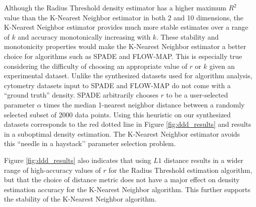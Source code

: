 \documentclass{article}
\begin{document}
Although the Radius Threshold density estimator has a higher maximum $R^2$ value than the K-Nearest Neighbor estimator in both 2 and 10 dimensions, the K-Nearest Neighbor estimator provides much more stable estimates over a range of $k$ and accuracy monotonically increasing with $k$. These stability and monotonicity properties would make the K-Nearest Neighbor estimator a better choice for algorithms such as SPADE and FLOW-MAP.  This is especially true considering the difficulty of choosing an appropriate value of $r$ or $k$ given an experimental dataset.  Unlike the synthesized datasets used for algorithm analysis, cytometry datasets input to SPADE and FLOW-MAP do not come with a ``ground truth'' density.  SPADE arbitrarily chooses $r$ to be a user-selected parameter $\alpha$ times the median 1-nearest neighbor distance between a randomly selected subset of 2000 data points. Using this heuristic on our synthesized datasets corresponds to the red dotted line in Figure \ref{fig:ddd_results} and results in a suboptimal density estimation. The K-Nearest Neighbor estimator avoids this ``needle in a haystack’’ parameter selection problem.

Figure \ref{fig:ddd_results} also indicates that using $L1$ distance results in a wider range of high-accuracy values of $r$ for the Radius Threshold estimation algorithm, but that the choice of distance metric does not have a major effect on density estimation accuracy for the K-Nearest Neighbor algorithm.  This further supports the stability of the K-Nearest Neighbor algorithm.  
\end{document}
